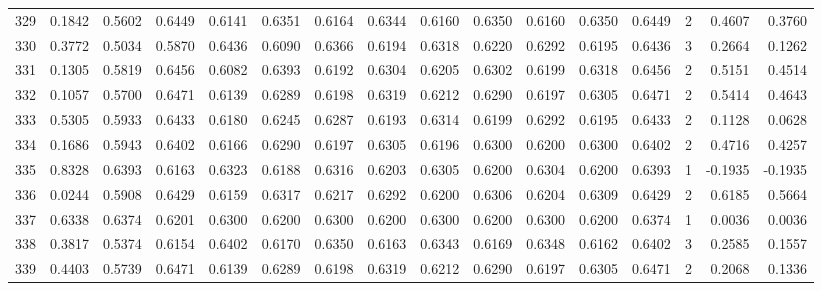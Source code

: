 \begin{tabular}{lrrrrrrrrrrrrrrr}
329 &      0.1842 &  0.5602 &  0.6449 &  0.6141 &  0.6351 &  0.6164 &  0.6344 &  0.6160 &  0.6350 &  0.6160 &   0.6350 &     0.6449 &      2 &                    0.4607 &                     0.3760 \\
330 &      0.3772 &  0.5034 &  0.5870 &  0.6436 &  0.6090 &  0.6366 &  0.6194 &  0.6318 &  0.6220 &  0.6292 &   0.6195 &     0.6436 &      3 &                    0.2664 &                     0.1262 \\
331 &      0.1305 &  0.5819 &  0.6456 &  0.6082 &  0.6393 &  0.6192 &  0.6304 &  0.6205 &  0.6302 &  0.6199 &   0.6318 &     0.6456 &      2 &                    0.5151 &                     0.4514 \\
332 &      0.1057 &  0.5700 &  0.6471 &  0.6139 &  0.6289 &  0.6198 &  0.6319 &  0.6212 &  0.6290 &  0.6197 &   0.6305 &     0.6471 &      2 &                    0.5414 &                     0.4643 \\
333 &      0.5305 &  0.5933 &  0.6433 &  0.6180 &  0.6245 &  0.6287 &  0.6193 &  0.6314 &  0.6199 &  0.6292 &   0.6195 &     0.6433 &      2 &                    0.1128 &                     0.0628 \\
334 &      0.1686 &  0.5943 &  0.6402 &  0.6166 &  0.6290 &  0.6197 &  0.6305 &  0.6196 &  0.6300 &  0.6200 &   0.6300 &     0.6402 &      2 &                    0.4716 &                     0.4257 \\
335 &      0.8328 &  0.6393 &  0.6163 &  0.6323 &  0.6188 &  0.6316 &  0.6203 &  0.6305 &  0.6200 &  0.6304 &   0.6200 &     0.6393 &      1 &                   -0.1935 &                    -0.1935 \\
336 &      0.0244 &  0.5908 &  0.6429 &  0.6159 &  0.6317 &  0.6217 &  0.6292 &  0.6200 &  0.6306 &  0.6204 &   0.6309 &     0.6429 &      2 &                    0.6185 &                     0.5664 \\
337 &      0.6338 &  0.6374 &  0.6201 &  0.6300 &  0.6200 &  0.6300 &  0.6200 &  0.6300 &  0.6200 &  0.6300 &   0.6200 &     0.6374 &      1 &                    0.0036 &                     0.0036 \\
338 &      0.3817 &  0.5374 &  0.6154 &  0.6402 &  0.6170 &  0.6350 &  0.6163 &  0.6343 &  0.6169 &  0.6348 &   0.6162 &     0.6402 &      3 &                    0.2585 &                     0.1557 \\
339 &      0.4403 &  0.5739 &  0.6471 &  0.6139 &  0.6289 &  0.6198 &  0.6319 &  0.6212 &  0.6290 &  0.6197 &   0.6305 &     0.6471 &      2 &                    0.2068 &                     0.1336 \\

\end{tabular}
